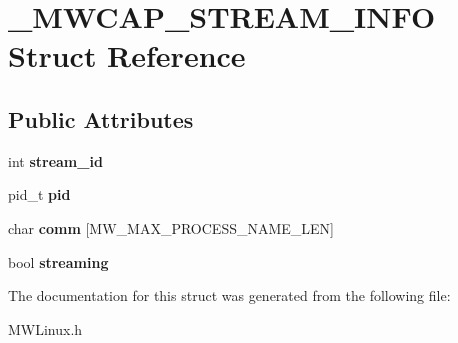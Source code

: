\hypertarget{struct__MWCAP__STREAM__INFO}{\section{\-\_\-\-M\-W\-C\-A\-P\-\_\-\-S\-T\-R\-E\-A\-M\-\_\-\-I\-N\-F\-O Struct Reference}
\label{struct__MWCAP__STREAM__INFO}
}
\subsection*{Public Attributes}
\begin{DoxyCompactItemize}
\item 
\hypertarget{struct__MWCAP__STREAM__INFO_a0bc6cb0922b401c1b52696f3b82b5ad5}{int {\bfseries stream\-\_\-id}}\label{struct__MWCAP__STREAM__INFO_a0bc6cb0922b401c1b52696f3b82b5ad5}

\item 
\hypertarget{struct__MWCAP__STREAM__INFO_a553e723efed52d13f6b788ca1d44ec26}{pid\-\_\-t {\bfseries pid}}\label{struct__MWCAP__STREAM__INFO_a553e723efed52d13f6b788ca1d44ec26}

\item 
\hypertarget{struct__MWCAP__STREAM__INFO_abbb070b75111012981f870429007cf52}{char {\bfseries comm} \mbox{[}M\-W\-\_\-\-M\-A\-X\-\_\-\-P\-R\-O\-C\-E\-S\-S\-\_\-\-N\-A\-M\-E\-\_\-\-L\-E\-N\mbox{]}}\label{struct__MWCAP__STREAM__INFO_abbb070b75111012981f870429007cf52}

\item 
\hypertarget{struct__MWCAP__STREAM__INFO_af3f94084f64ef49632554ab5274dd5b4}{bool {\bfseries streaming}}\label{struct__MWCAP__STREAM__INFO_af3f94084f64ef49632554ab5274dd5b4}

\end{DoxyCompactItemize}


The documentation for this struct was generated from the following file\-:\begin{DoxyCompactItemize}
\item 
M\-W\-Linux.\-h\end{DoxyCompactItemize}
